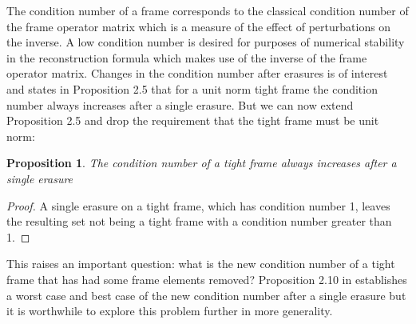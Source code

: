 \documentclass[11pt, reqno]{amsart}
\newtheorem{prop}[theorem]{Proposition}
\numberwithin{equation}{section}
\begin{document}
The condition number of a frame corresponds to the classical condition number of the frame operator matrix which is a measure of the effect of perturbations on the inverse.
A low condition number is desired for purposes of numerical stability in the reconstruction formula which makes use of the inverse of the frame operator matrix. Changes in the condition number after erasures is of interest and \cite{Datta2020} states in Proposition 2.5 that for a unit norm tight frame the condition number always increases after a single erasure. But we can now extend Proposition 2.5 and drop the requirement that the tight frame must be unit norm:

\begin{prop}
	The condition number of a tight frame always increases after a single erasure
\end{prop}

\begin{proof}
	A single erasure on a tight frame, which has condition number 1, leaves the resulting set not being a tight frame with a condition number greater than 1.
\end{proof}

 This raises an important question: what is the new condition number of a tight frame that has had some frame elements removed? Proposition 2.10 in \cite{Datta2020} establishes a worst case and best case of the new condition number after a single erasure but it is worthwhile to explore this problem further in more generality.
 
\end{document}
